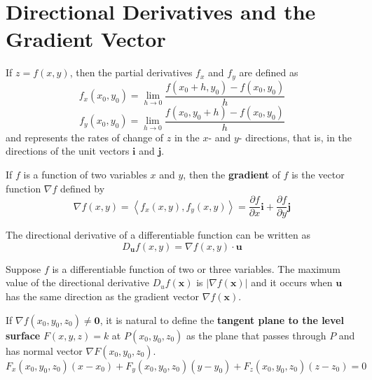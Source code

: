 \section{Directional Derivatives and the Gradient Vector}
\begin{definition}
	If $z = f\left(x,y\right)$, then the partial derivatives $f_x$ and $f_y$ are defined as
	\begin{equation*}
	f_x\left(x_0,y_0\right) = \lim\limits_{h \to 0} \frac{f\left(x_0 + h, y_0\right) - f\left(x_0,y_0\right)}{h}
	\end{equation*}
	\begin{equation*}
	f_y\left(x_0,y_0\right)=\lim\limits_{h \to 0} \frac{f\left(x_0, y_0 + h\right) - f\left(x_0,y_0\right)}{h}
	\end{equation*}
	and represents the rates of change of $z$ in the $x$- and $y$- directions, that is, in the directions of the unit vectors $\mathbf{i}$ and $\mathbf{j}$.
\end{definition}
\begin{definition}
	If $f$ is a function of two variables $x$ and $y$, then the \textbf{gradient} of $f$ is the vector function $\nabla f$ defined by
	\begin{equation}
	\label{equation-gradient-vector}
	\nabla f\left(x,y\right) = \left\langle f_x\left(x,y\right), f_y\left(x,y\right) \right\rangle = \frac{\partial f}{\partial x}\mathbf{i} + \frac{\partial f}{\partial y}\mathbf{j}
	\end{equation}
\end{definition}
\begin{definition}
	The directional derivative of a differentiable function can be written as
	\begin{equation}
	\label{directional-derivative-gradient-vector}
	D_{\mathbf{u}}f\left(x,y\right) = \nabla f\left(x,y\right) \cdot \mathbf{u}
	\end{equation}
\end{definition}
\begin{theorem}
	Suppose $f$ is a differentiable function of two or three variables. The maximum value of the directional derivative $D_uf\left(\mathbf{x}\right)$ is $\left| \nabla f\left(\mathbf{x}\right) \right|$ and it occurs when $\mathbf{u}$ has the same direction as the gradient vector $\nabla f\left(\mathbf{x}\right)$.
\end{theorem}
\begin{definition}
	If $\nabla f\left(x_0, y_0, z_0\right) \neq \mathbf{0}$, it is natural to define the \textbf{tangent plane to the level surface} $F\left(x,y,z\right) = k$ at $P\left(x_0,y_0,z_0\right)$ as the plane that passes through $P$ and has normal vector $\nabla F\left(x_0,y_0,z_0\right)$.
	\begin{equation}
	\label{equation-tangent-plane-level-surface}
	F_x\left(x_0,y_0,z_0\right)\left(x-x_0\right)+F_y\left(x_0,y_0,z_0\right)\left(y-y_0\right)+F_z\left(x_0,y_0,z_0\right)\left(z-z_0\right)=0
	\end{equation}
\end{definition}
